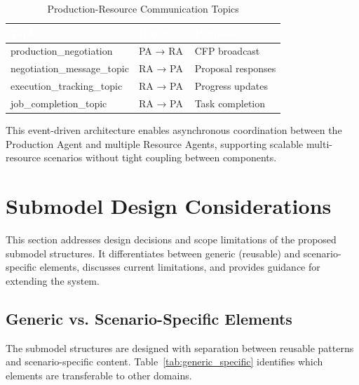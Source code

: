 \begin{table}[ht]
\centering
\caption{Production-Resource Communication Topics}
\label{tab:external_topics}
\begin{tabular}{lll}
\toprule
\rowcolor{headerblue}
\textcolor{white}{Topic} & \textcolor{white}{Direction} & \textcolor{white}{Purpose} \\
\midrule
production\_negotiation & PA → RA & CFP broadcast \\
negotiation\_message\_topic & RA → PA & Proposal responses \\
execution\_tracking\_topic & RA → PA & Progress updates \\
job\_completion\_topic & RA → PA & Task completion \\
\bottomrule
\end{tabular}
\end{table}
This event-driven architecture enables asynchronous coordination between the Production Agent and multiple Resource Agents, supporting scalable multi-resource scenarios without tight coupling between components.

\section{Submodel Design Considerations}

\label{sec:submodel_design}

This section addresses design decisions and scope limitations of the proposed submodel structures. It differentiates between generic (reusable) and scenario-specific elements, discusses current limitations, and provides guidance for extending the system.
\subsection{Generic vs. Scenario-Specific Elements}
\label{subsec:generic_vs_specific}

The submodel structures are designed with separation between reusable patterns and scenario-specific content. Table~\ref{tab:generic_specific} identifies which elements are transferable to other domains.

